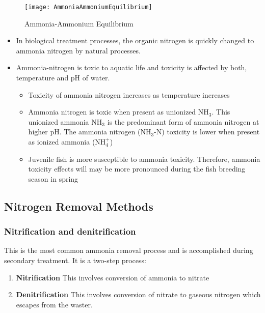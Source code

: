 \begin{figure}
	\begin{center}
		\texttt{[image: AmmoniaAmmoniumEquilibrium]}
			\caption{Ammonia-Ammonium Equilibrium}
	\end{center}
	
	\end{figure}
	\begin{itemize}
		\item In biological treatment processes, the organic nitrogen is quickly changed to ammonia nitrogen by natural processes.
		\item Ammonia-nitrogen is toxic to aquatic life and toxicity is affected by both, temperature and pH of water. 
			\begin{itemize}
				\item Toxicity of ammonia nitrogen increases as temperature increases
				\item Ammonia nitrogen is toxic when present as unionized NH$_3$.  This unionized ammonia NH$_3$ is the predominant form of ammonia nitrogen at higher pH.  The ammonia nitrogen (NH$_3$-N) toxicity is lower when present as  ionized ammonia (NH$_4^+$)
				\item Juvenile fish is more susceptible to ammonia toxicity.  Therefore, ammonia toxicity effects will may be more pronounced during the fish breeding season in spring		
			\end{itemize}
	\end{itemize}
	\vspace{0.3cm}
	
	\subsection{Nitrogen Removal Methods}
	
		\subsubsection{Nitrification and denitrification}

This is the most common ammonia removal process and is accomplished during secondary treatment.  It is a two-step process:
			\begin{enumerate}
				\item \textbf{Nitrification} This involves conversion of ammonia to nitrate
				\item \textbf{Denitrification} This involves conversion of nitrate to gaseous nitrogen which escapes from the waster.
			\end{enumerate}


